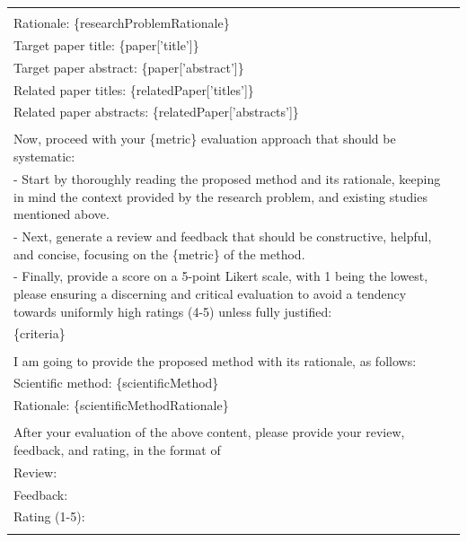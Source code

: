 \documentclass[11pt]{article}
\begin{document}
\begin{table}
{\begin{tabular}{ll}
{            \multicolumn{1}{p{.92\textwidth}}{{Research problem: \{researchProblem\}}} \\
            \multicolumn{1}{p{.92\textwidth}}{{Rationale: \{researchProblemRationale\}}} \\ 
            \multicolumn{1}{p{.92\textwidth}}{{Target paper title: \{paper['title']\}}} \\
            \multicolumn{1}{p{.92\textwidth}}{{Target paper abstract: \{paper['abstract']\} }} \\
            \multicolumn{1}{p{.92\textwidth}}{{Related paper titles: \{relatedPaper['titles']\}}} \\
            \multicolumn{1}{p{.92\textwidth}}{{Related paper abstracts: \{relatedPaper['abstracts']\} }} \\ \\
            \multicolumn{1}{p{.92\textwidth}}{{Now, proceed with your \{metric\} evaluation approach that should be systematic:}} \\
            \multicolumn{1}{p{.92\textwidth}}{{- Start by thoroughly reading the proposed method and its rationale, keeping in mind the context provided by the research problem, and existing studies mentioned above.}} \\
            \multicolumn{1}{p{.92\textwidth}}{{- Next, generate a review and feedback that should be constructive, helpful, and concise, focusing on the \{metric\} of the method.}} \\
            \multicolumn{1}{p{.92\textwidth}}{{- Finally, provide a score on a 5-point Likert scale, with 1 being the lowest, please ensuring a discerning and critical evaluation to avoid a tendency towards uniformly high ratings (4-5) unless fully justified:}} \\ 
            \multicolumn{1}{p{.92\textwidth}}{{\{criteria\}}} \\ \\
            \multicolumn{1}{p{.92\textwidth}}{{I am going to provide the proposed method with its rationale, as follows:}} \\
            \multicolumn{1}{p{.92\textwidth}}{{Scientific method: \{scientificMethod\}}} \\
            \multicolumn{1}{p{.92\textwidth}}{{Rationale: \{scientificMethodRationale\}}} \\ \\
            \multicolumn{1}{p{.92\textwidth}}{{After your evaluation of the above content, please provide your review, feedback, and rating, in the format of}} \\ 
            \multicolumn{1}{p{.92\textwidth}}{{Review: }} \\
            \multicolumn{1}{p{.92\textwidth}}{{Feedback: }} \\
            \multicolumn{1}{p{.92\textwidth}}{{Rating (1-5): }} \\
        } \\
        \bottomrule
        \end{tabular}
    }
\end{table}
\end{document}
